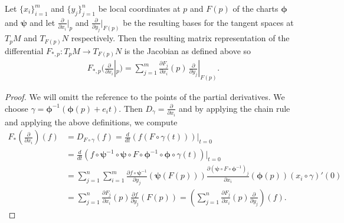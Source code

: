 \documentclass[../main.tex]{subfiles}
\begin{document}
\begin{proposition}
    Let $\{x_i\}_{i=1}^m$ and $\{y_j\}_{j=1}^n$ be local coordinates at 
    $p$ and $F(p)$ of the charts $\bm{\phi}$ and $\bm{\psi}$ and let $\frac{\partial}{\partial x_i}|_p$ and 
    $\frac{\partial}{\partial y_j}|_{F(p)}$ be the resulting bases for the 
    tangent spaces at $T_p M$ and $T_{F(p)} N$ respectively. Then 
    the resulting matrix representation of the differential 
    $F_{*,p}:T_p M \rightarrow 
    T_{F(p)}N$ is the Jacobian as defined above so
    \begin{align*}
        F_{*,p} \bigg( \frac{\partial}{\partial x_i}|_p \bigg)
        = \sum_{j=1}^m \frac{\partial F_j}{\partial x_i}(p)\,
            \frac{\partial}{\partial y_j}|_{F(p)}. 
    \end{align*}
\end{proposition}
\begin{proof}
    We will omitt the reference to the points of the partial derivatives.
    We choose $\gamma = \boldsymbol{\phi}^{-1}(\boldsymbol{\phi}(p) + e_i t)$. Then 
    $D_\gamma = \frac{\partial}{\partial x_i}$ and by applying the chain 
    rule and applying the above definitions, we compute
    \begin{align*}
        F_{*}(\frac{\partial}{\partial x_i})(f)
        &= D_{F\circ \gamma}(f)
        = \frac{d}{dt} (f(F \circ \gamma(t) ) )|_{t=0} 
        \\ &= \frac{d}{dt} (f \circ \boldsymbol{\psi}^{-1} \circ \boldsymbol{\psi}   
            \circ F \circ \boldsymbol{\phi}^{-1} \circ \boldsymbol{\phi} \circ \gamma(t)  )|_{t=0}
        \\ &= \sum_{j=1}^n \sum_{i=1}^m \frac{\partial f \circ \boldsymbol{\psi}^{-1}}{\partial y_j}
            (\boldsymbol{\psi}(F(p)))  \frac{\partial (\boldsymbol{\psi} \circ F \circ \boldsymbol{\phi}^{-1})_j}{\partial x_i}
            (\boldsymbol{\phi}(p))  (x_i \circ \gamma)'(0)
        \\ &= \sum_{j=1}^n \frac{\partial F_j}{\partial x_i}(p) 
            \frac{\partial f}{\partial y_j}(F(p))
        = \left( \sum_{j=1}^n \frac{\partial F_j}{\partial x_i}(p) 
            \frac{\partial}{\partial y_j} \right) (f).
    \end{align*} 
\end{proof}
\end{document}
